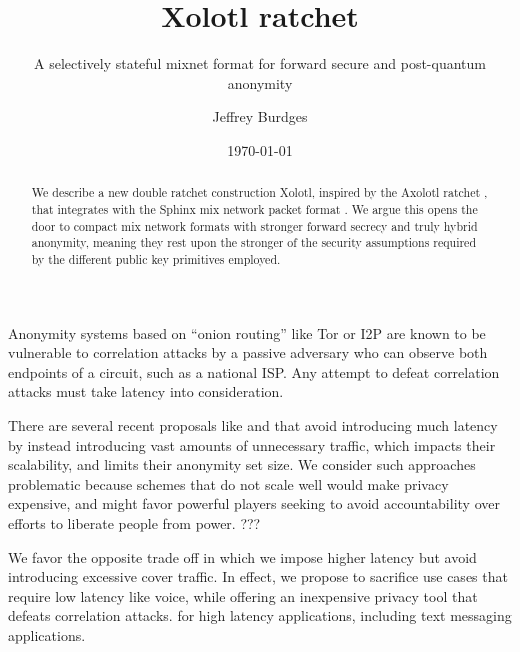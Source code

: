 \documentclass[twoside,letterpaper]{llncs}
\title{Xolotl ratchet}
\subtitle{A selectively stateful mixnet format for forward secure and post-quantum anonymity}
\author{Jeffrey Burdges}
\date{\today}
\begin{document}
\maketitle



\begin{abstract}
We describe a new double ratchet construction Xolotl,
 inspired by the Axolotl ratchet \cite{TextSecure}, that
integrates with the Sphinx mix network packet format \cite{Sphinx}.
We argue this opens the door to compact mix network formats with
stronger forward secrecy and truly hybrid anonymity, meaning they
rest upon the stronger of the security assumptions required by
 the different public key primitives employed.
\end{abstract}



Anonymity systems based on ``onion routing'' \cite{SS03,timing-fc2004}
like Tor or I2P are known to be vulnerable to correlation attacks by
a passive adversary who can observe both endpoints of a circuit, such
as a national ISP.   Any attempt to defeat correlation attacks must
take latency into consideration. 

There are several recent proposals like \cite{Alpenhorn} and
\cite{Dissent} that avoid introducing much latency by instead
introducing vast amounts of unnecessary traffic, which impacts their
scalability, and limits their anonymity set size.  We consider such
approaches problematic because schemes that do not scale well would
make privacy expensive, and might favor powerful players seeking to
avoid accountability over efforts to liberate people from power. ???

We favor the opposite trade off in which we impose higher latency but
avoid introducing excessive cover traffic. In effect, we propose to
sacrifice use cases that require low latency like voice, while
offering an inexpensive privacy tool that defeats correlation attacks.
for high latency applications, including text messaging applications.
\end{document}
